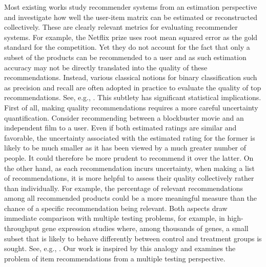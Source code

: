 \documentclass[12pt]{article}
\theoremstyle{plain}
\begin{document}
\begin{sloppypar}
Most existing works study recommender systems from an estimation perspective and investigate how well the user-item matrix can be estimated or reconstructed collectively. These are clearly relevant metrics for evaluating recommender systems. For example, the Netflix prize uses root mean squared error as the gold standard for the competition. Yet they do not account for the fact that only a subset of the products can be recommended to a user and as such estimation accuracy may not be directly translated into the quality of these recommendations. Instead, various classical notions for binary classification such as precision and recall are often adopted in practice to evaluate the quality of top recommendations. See, e.g., \cite{herlocker2004evaluating}. This subtlety has significant statistical implications. First of all, making quality recommendations requires a more careful uncertainty quantification. Consider recommending between a blockbuster movie and an independent film to a user. Even if both estimated ratings are similar and favorable, the uncertainty associated with the estimated rating for the former is likely to be much smaller as it has been viewed by a much greater number of people. It could therefore be more prudent to recommend it over the latter. On the other hand, as each recommendation incurs uncertainty, when making a list of recommendations, it is more helpful to assess their quality collectively rather than individually. For example, the percentage of relevant recommendations among all recommended products could be a more meaningful measure than the chance of a specific recommendation being relevant. Both aspects draw immediate comparison with multiple testing problems, for example, in high-throughput gene expression studies where, among thousands of genes, a small subset that is likely to behave differently between control and treatment groups is sought. See, e.g., \cite{storey2003statistical, efron2007correlation, efron2012large}. Our work is inspired by this analogy and examines the problem of item recommendations from a multiple testing perspective.


\end{sloppypar}
\end{document}
